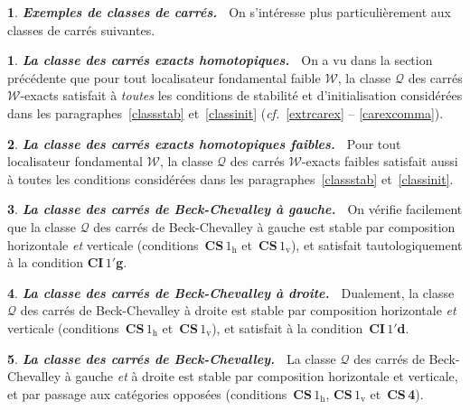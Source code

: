 \documentclass[francais]{smfart}
\theoremstyle{plain}
\theoremstyle{remark}
\theoremstyle{definition}
\newtheorem{paragr}[thm]{}
\newtheorem{subparagr}{}[thm]
\numberwithin{equation}{thm}
\begin{document}
\begin{paragr} {\emph{\textbf{{Exemples de classes de carrés}.\ }}} \label{classex}
On s'intéresse plus particulièrement aux classes de carrés suivantes.
\smallskip

\begin{subparagr} {\emph{\textbf{{La classe des carrés exacts homotopiques}.\ }}} \label{classcarex}
On a vu dans la section précédente que pour tout localisateur fondamental faible ${\mathcal{W}}$, la classe ${\mathcal{Q}}$ des carrés ${\mathcal{W}}${\nobreakdash}-exacts satisfait à \emph{toutes} les conditions de stabilité et d'initialisation considérées dans les paragraphes~\ref{classstab} et~\ref{classinit} 
({\emph{cf.}}~\ref{extrcarex} -- \ref{carexcomma}).
\end{subparagr}

\begin{subparagr} {\emph{\textbf{{La classe des carrés exacts homotopiques faibles}.\ }}} \label{classcarexf}
Pour tout localisateur fondamental ${\mathcal{W}}$, la classe ${\mathcal{Q}}$ des carrés ${\mathcal{W}}${\nobreakdash}-exacts faibles satisfait aussi à toutes les conditions considérées dans les paragraphes~\ref{classstab} et~\ref{classinit}.
\end{subparagr}

\begin{subparagr} {\emph{\textbf{{La classe des carrés de Beck-Chevalley à gauche}.\ }}} \label{classcarBCg} On vérifie facilement que la classe ${\mathcal{Q}}$ des carrés de Beck-Chevalley à gauche est stable par composition horizontale \emph{et} verticale (conditions~\textbf{\boldmath CS\,$1_{\mathrm h}$} et~\textbf{\boldmath CS\,$1_{\mathrm v}$}), et satisfait tautologiquement à la condition \textbf{\boldmath CI\,$1'$g}. 
\end{subparagr}

\begin{subparagr} {\emph{\textbf{{La classe des carrés de Beck-Chevalley à droite}.\ }}} \label{classcarBCd} Dualement, la classe ${\mathcal{Q}}$ des carrés de Beck-Chevalley à droite est stable par composition horizontale \emph{et} verticale (conditions~\textbf{\boldmath CS\,$1_{\mathrm h}$} et~\textbf{\boldmath CS\,$1_{\mathrm v}$}), et satisfait à la condition~\textbf{\boldmath CI\,$1'$d}. 
\end{subparagr}

\begin{subparagr} {\emph{\textbf{{La classe des carrés de Beck-Chevalley}.\ }}} \label{classcarBCgd} La classe ${\mathcal{Q}}$ des carrés de Beck-Chevalley à gauche \emph{et} à droite est stable par composition horizontale et verticale, et par passage aux catégories opposées (conditions~\textbf{\boldmath CS\,$1_{\mathrm h}$}, \textbf{\boldmath CS\,$1_{\mathrm v}$} et~\textbf{CS\,4}). 
\end{subparagr}


\end{paragr}
\end{document}
